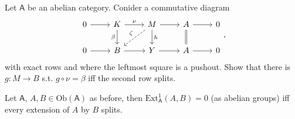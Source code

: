 \begin{lem}
	Let $\mathsf{A}$ be an abelian category.
	Conider a commutative diagram
	\begin{equation}
	\begin{tikzcd}
		0 \arrow[r, "", rightarrow] &
		K \arrow[r, "\nu", rightarrow] \arrow[d, "\beta"', rightarrow] &
		M \arrow[r, "", rightarrow] \arrow[d, "h", rightarrow] \arrow[ld, "\zeta"', dashrightarrow] &
		A \arrow[r, "", rightarrow] \arrow[d, "", equal] &
		0\\
		0 \arrow[r, "", rightarrow] &
		B \arrow[r, "", rightarrow] &
		Y \arrow[r, "", rightarrow] &
		A \arrow[r, "", rightarrow] &
		0
	\end{tikzcd}
	,\end{equation} 
	with exact rows and where the leftmost square is a pushout.
	Show that there is $g: M \to B$ s.t. $g \circ \nu = \beta$
	iff the second row splits.
\end{lem} 

\begin{lem}
	Let $\mathsf{A}$, $A,B \in \mathrm{Ob} \left(\mathsf{A}\right)$ as before,
	then $\mathrm{Ext}^{ 1}_{ \mathsf{A}} \left( A, B \right) = 0$ (as abelian groups)
	iff every extension of $A$ by $B$ splits.
\end{lem} 

